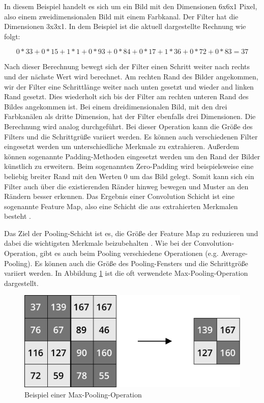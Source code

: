 In diesem Beispiel handelt es sich um ein Bild mit den Dimensionen 6x6x1 Pixel, also einem zweidimensionalen Bild mit einem Farbkanal. Der Filter hat die Dimensionen 3x3x1. In dem Beispiel ist die aktuell dargestellte Rechnung wie folgt:

\begin{equation*}
0*33+0*15+1*1+0*93+0*84+0*17+1*36+0*72+0*83=37
\end{equation*}

Nach dieser Berechnung bewegt sich der Filter einen Schritt weiter nach rechts und der nächste Wert wird berechnet. Am rechten Rand des Bilder angekommen, wir der Filter eine Schrittlänge weiter nach unten gesetzt und wieder and linken Rand gesetzt. Dies wiederholt sich bis der Filter am rechten unteren Rand des Bildes angekommen ist. Bei einem dreidimensionalen Bild, mit den drei Farbkanälen als dritte Dimension, hat der Filter ebenfalls drei Dimensionen. Die Berechnung wird analog durchgeführt. Bei dieser Operation kann die Größe des Filters und die Schrittgrüße variiert werden. Es können auch verschiedenen Filter eingesetzt werden um unterschiedliche Merkmale zu extrahieren. Außerdem können sogenannte Padding-Methoden eingesetzt werden um den Rand der Bilder künstlich zu erweitern. Beim sogenannten Zero-Padding wird beispielsweise eine beliebig breiter Rand mit den Werten 0 um das Bild gelegt. Somit kann sich ein Filter auch über die existierenden Ränder hinweg bewegen und Muster an den Rändern besser erkennen. Das Ergebnis einer Convolution Schicht ist eine sogenannte Feature Map, also eine Schicht die aus extrahierten Merkmalen besteht \cite{lecun1997convolutional}.

Das Ziel der Pooling-Schicht ist es, die Größe der Feature Map zu reduzieren und dabei die wichtigsten Merkmale beizubehalten \cite{scherer2010evaluation}. Wie bei der Convolution-Operation, gibt es auch beim Pooling verschiedene Operationen (e.g. Average-Pooling). Es können auch die Größe des Pooling-Fensters und die Schrittgröße variiert werden. In Abbildung \ref{fig_pool_operation} ist die oft verwendete Max-Pooling-Operation dargestellt.

\begin{figure}[h]
\centering
\includegraphics[scale=0.4]{images/pool_operation.pdf}
\caption{Beispiel einer Max-Pooling-Operation}
\label{fig_pool_operation}
\end{figure}

